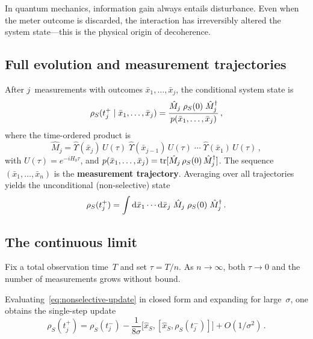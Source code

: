 \begin{intuition}
  In quantum mechanics, information gain always entails disturbance.
  Even when the meter outcome is discarded, the interaction has
  irreversibly altered the system state---this is the physical
  origin of decoherence.
\end{intuition}

\subsection{Full evolution and measurement trajectories}%
\label{sec:full-evolution}

After $j$~measurements with outcomes
$\bar{x}_1, \ldots, \bar{x}_j$, the conditional system state is
\begin{equation}\label{eq:selective-full}
  \rho_S(t_j^+ \mid \bar{x}_1, \ldots, \bar{x}_j)
  = \frac{\hat{M}_j \;\rho_S(0)\; \hat{M}_j^\dagger}
         {p(\bar{x}_1, \ldots, \bar{x}_j)}\,,
\end{equation}
where the time-ordered product is
\begin{equation}\label{eq:composite-op}
  \hat{M}_j
  = \hat{\Upsilon}(\bar{x}_j)\,U(\tau)\;
    \hat{\Upsilon}(\bar{x}_{j-1})\,U(\tau)
    \;\cdots\;
    \hat{\Upsilon}(\bar{x}_1)\,U(\tau)\,,
\end{equation}
with $U(\tau) = e^{-iH_0\tau}$, and
$p(\bar{x}_1, \ldots, \bar{x}_j)
= \operatorname{tr}[\hat{M}_j\,\rho_S(0)\,\hat{M}_j^\dagger]$.
The sequence $(\bar{x}_1, \ldots, \bar{x}_n)$ is the
\textbf{measurement trajectory}.  Averaging over all trajectories
yields the unconditional (non-selective) state
\begin{equation}\label{eq:nonselective-full}
  \rho_S(t_j^+)
  = \int \mathrm{d}\bar{x}_1 \cdots \mathrm{d}\bar{x}_j\;
    \hat{M}_j\;\rho_S(0)\;\hat{M}_j^\dagger\,.
\end{equation}

\subsection{The continuous limit}\label{sec:continuous-limit}

Fix a total observation time~$T$ and set $\tau = T/n$.  As
$n \to \infty$, both $\tau \to 0$ and the number of measurements
grows without bound.

\begin{keyresult}
  Evaluating~\eqref{eq:nonselective-update} in closed form and
  expanding for large~$\sigma$, one obtains the single-step update
  \begin{equation}\label{eq:single-step-expanded}
    \rho_S(t_j^+)
    = \rho_S(t_j^-)
      - \frac{1}{8\sigma}\bigl[\hat{x}_S,
        [\hat{x}_S, \rho_S(t_j^-)]\bigr]
      + O(1/\sigma^2)\,.
  \end{equation}
\end{keyresult}

